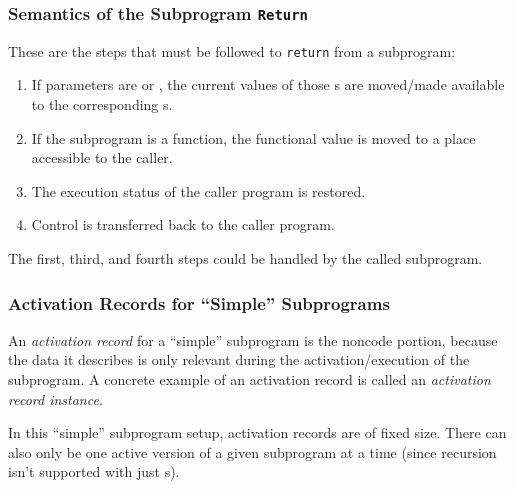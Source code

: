 \subsubsection{Semantics of the Subprogram \texttt{Return}}\label{subsubsec:Implementing_Simple_Subprogram-Return}
These are the steps that must be followed to \texttt{return} from a subprogram:
\begin{enumerate}[noitemsep]
\item If parameters are  or , the current values of those s are moved/made available to the corresponding s.
\item If the subprogram is a function, the functional value is moved to a place accessible to the caller.
\item The execution status of the caller program is restored.
\item Control is transferred back to the caller program.
\end{enumerate}

The first, third, and fourth steps could be handled by the called subprogram.

\subsubsection{Activation Records for ``Simple'' Subprograms}\label{subsubsec:Implementing_Simple_Subprogram-Activation_Record}
\begin{definition}\label{def:Activation_Record-Simple_Subprograms}
  An \emph{activation record} for a ``simple'' subprogram is the noncode portion, because the data it describes is only relevant during the activation/execution of the subprogram.
  A concrete example of an activation record is called an \emph{activation record instance}.

  In this ``simple'' subprogram setup, activation records are of fixed size.
  There can also only be one active version of a given subprogram at a time (since recursion isn't supported with just s).
\end{definition}


